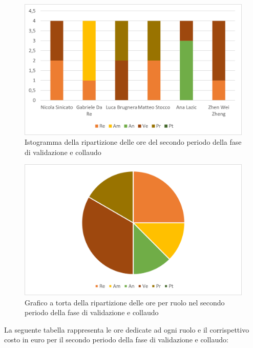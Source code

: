 \begin{figure}[H]
    \centering
    \includegraphics[scale=0.6]{img/grafi preventivo/istogrammi/validazione/periodo2.png}
    \caption{Istogramma della ripartizione delle ore del secondo periodo della fase di validazione e collaudo}
\end{figure}
\begin{figure}[H]
    \centering
    \includegraphics[scale=0.6]{img/grafi preventivo/torta/validazione/periodo2.png}
    \caption{Grafico a torta della ripartizione delle ore per ruolo nel secondo periodo della fase di validazione e collaudo}
\end{figure}
La seguente tabella rappresenta le ore dedicate ad ogni ruolo e il corrispettivo costo in euro per il secondo periodo della fase di validazione e collaudo:

